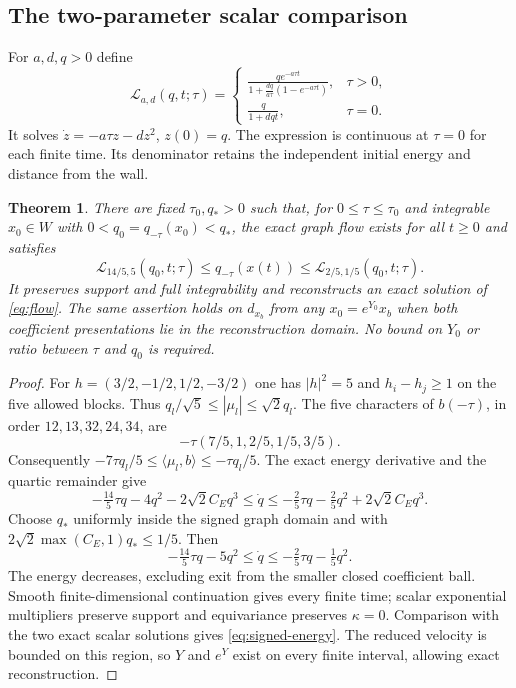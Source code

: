 \documentclass[11pt]{amsart}
\newtheorem{theorem}{Theorem}[section]
\theoremstyle{definition}
\theoremstyle{remark}
\begin{document}


\subsection{The two-parameter scalar comparison}
For $a,d,q>0$ define
\begin{equation}\label{eq:logistic}
 \mathcal L_{a,d}(q,t;\tau)=
 \begin{cases}
 \displaystyle\frac{q e^{-a\tau t}}
 {1+\frac{dq}{a\tau}(1-e^{-a\tau t})},&\tau>0,\\[6pt]
 \displaystyle\frac{q}{1+dqt},&\tau=0.
 \end{cases}
\end{equation}
It solves $\dot z=-a\tau z-dz^2$, $z(0)=q$.
The expression is continuous at $\tau=0$ for each finite
time. Its denominator retains the independent initial energy
and distance from the wall.

\begin{theorem}\label{thm:signed-energy}
There are fixed $\tau_0,q_*>0$ such that, for
$0\le\tau\le\tau_0$ and integrable $x_0\in W$ with
$0<q_0=q_{-\tau}(x_0)<q_*$, the exact graph flow exists for
all $t\ge0$ and satisfies
\begin{equation}\label{eq:signed-energy}
 \mathcal L_{14/5,5}(q_0,t;\tau)\le q_{-\tau}(x(t))
                      \le\mathcal L_{2/5,1/5}(q_0,t;\tau).
\end{equation}
It preserves support and full integrability and reconstructs
an exact solution of \eqref{eq:flow}. The same assertion holds
on $d_{x_b}$ from any $x_0=e^{Y_0}x_b$ when both coefficient
presentations lie in the reconstruction domain. No bound
on $Y_0$ or ratio between $\tau$ and $q_0$ is required.
\end{theorem}
\begin{proof}
For $h=(3/2,-1/2,1/2,-3/2)$ one has $|h|^2=5$ and
$h_i-h_j\ge1$ on the five allowed blocks. Thus
$q_l/\sqrt5\le|\mu_l|\le\sqrt2q_l$.
The five characters of $b(-\tau)$, in order $12,13,32,24,34$,
are
\[
 -\tau(7/5,1,2/5,1/5,3/5).
\]
Consequently
$-7\tau q_l/5\le\langle\mu_l,b\rangle\le-\tau q_l/5$.
The exact energy derivative and the quartic remainder give
\[
 -\tfrac{14}{5}\tau q-4q^2-2\sqrt2C_Eq^3
 \le\dot q\le
 -\tfrac25\tau q-\tfrac25q^2+2\sqrt2C_Eq^3.
\]
Choose $q_*$ uniformly inside the signed graph domain and
with $2\sqrt2\max(C_E,1)q_*\le1/5$. Then
\begin{equation}\label{eq:signed-differential}
 -\tfrac{14}{5}\tau q-5q^2\le\dot q
                  \le-\tfrac25\tau q-\tfrac15q^2.
\end{equation}
The energy decreases, excluding exit from the smaller closed
coefficient ball. Smooth finite-dimensional continuation gives
every finite time; scalar exponential multipliers preserve
support and equivariance preserves $\kappa=0$. Comparison with
the two exact scalar solutions gives \eqref{eq:signed-energy}.
The reduced velocity is bounded on this region, so $Y$ and
$e^Y$ exist on every finite interval, allowing exact reconstruction.
\end{proof}
\end{document}
